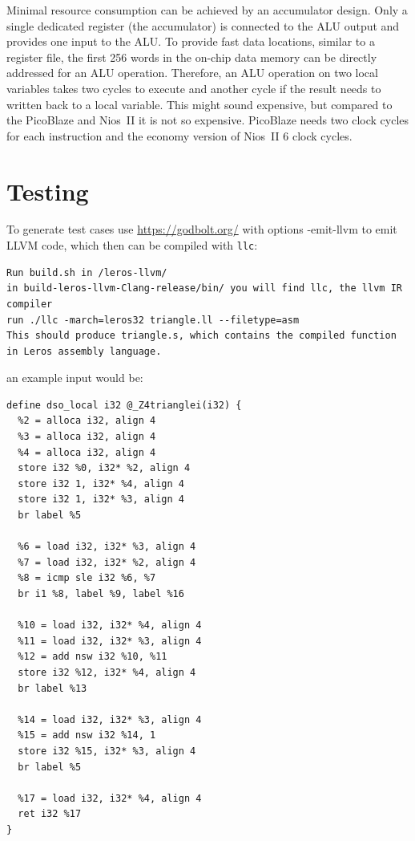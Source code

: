 \documentclass[a4paper,fontsize=10pt,twoside,DIV15,BCOR12mm,headinclude=true,footinclude=false,pagesize,bibtotoc]{scrbook}
\newcommand{\code}[1]{{\small{\texttt{#1}}}}
\begin{document}
Minimal resource consumption can be achieved by an accumulator design. Only a single dedicated register (the accumulator) is connected to the ALU output and provides one input to the ALU. To provide fast data locations, similar to a register file, the first 256 words in the on-chip data memory can be directly addressed for an ALU operation. Therefore, an ALU operation on two local variables takes two cycles to execute and another cycle if the result needs to written back to a local variable. This might sound expensive, but compared to the PicoBlaze and Nios~II it is not so expensive. PicoBlaze needs two clock cycles for each instruction and the economy version of Nios~II 6 clock cycles.

\chapter{Testing}

To generate test cases use \url{https://godbolt.org/} with options -emit-llvm to emit LLVM code,
which then can be compiled with \code{llc}:

\begin{verbatim}
Run build.sh in /leros-llvm/
in build-leros-llvm-Clang-release/bin/ you will find llc, the llvm IR compiler
run ./llc -march=leros32 triangle.ll --filetype=asm
This should produce triangle.s, which contains the compiled function in Leros assembly language. 
\end{verbatim}

an example input would be:

\begin{verbatim}
define dso_local i32 @_Z4trianglei(i32) {
  %2 = alloca i32, align 4
  %3 = alloca i32, align 4
  %4 = alloca i32, align 4
  store i32 %0, i32* %2, align 4
  store i32 1, i32* %4, align 4
  store i32 1, i32* %3, align 4
  br label %5

  %6 = load i32, i32* %3, align 4
  %7 = load i32, i32* %2, align 4
  %8 = icmp sle i32 %6, %7
  br i1 %8, label %9, label %16

  %10 = load i32, i32* %4, align 4
  %11 = load i32, i32* %3, align 4
  %12 = add nsw i32 %10, %11
  store i32 %12, i32* %4, align 4
  br label %13

  %14 = load i32, i32* %3, align 4
  %15 = add nsw i32 %14, 1
  store i32 %15, i32* %3, align 4
  br label %5

  %17 = load i32, i32* %4, align 4
  ret i32 %17
}
\end{verbatim}
\end{document}

